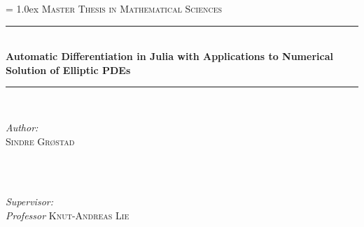 \begin{titlepage}

\newcommand{\HRule}{\rule{\linewidth}{0.5mm}} %

\center %
 

\parindent=0.0cm
\parskip = 1.0ex
\vspace*{1.5cm}
\textsc{\Large Master Thesis in Mathematical Sciences}\\[0.5cm] %


\HRule \\[0.7cm]
{ \huge \bfseries Automatic Differentiation in Julia with Applications to Numerical Solution of Elliptic PDEs}\\[0.4cm] %
\HRule \\[1.5cm]
 

\begin{minipage}{0.4\textwidth}
\begin{flushleft} \large
\emph{Author:} \\ 
\textsc{Sindre Grøstad} \\ %
\textsc{ } \\
\end{flushleft}
\end{minipage}
~
\begin{minipage}{0.5\textwidth}
\begin{flushright} \large
\emph{Supervisor:} \\
\emph{Professor} \textsc{Knut-Andreas Lie} \\%
\end{flushright}
\end{minipage}\\[4cm]
\vspace{5cm}


\end{titlepage}
